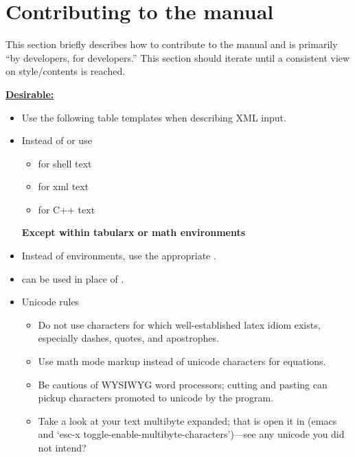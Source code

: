 
\chapter{Contributing to the manual}
\label{chap:contrib}

This section briefly describes how to contribute to the manual and is primarily ``by developers, for developers.''   This section should iterate until a consistent view on style/contents is reached.

\textbf{\underline{Desirable:}}
\begin{itemize}
\item{Use the following table templates when describing XML input.}
\item{Instead of \ilatex{\\texttt} or \ilatex{\\verb} use
    \begin{itemize}
      \item{\ilatex{\\ishell} for shell text}
      \item{\ilatex{\\ixml} for xml text}
      \item{\ilatex{\\icode} for C++ text}
      \end{itemize}
     \bf{Except} within tabularx or math environments}
    \item{Instead of  environments, use the appropriate }.
\item{ can be used in place of }.
\item{Unicode rules}
\begin{itemize}
\item Do not use characters for which well-established latex idiom exists, especially dashes, quotes, and apostrophes.
\item Use math mode markup instead of unicode characters for equations.
\item Be cautious of WYSIWYG word processors; cutting and pasting can pickup characters promoted to unicode by the program.
\item Take a look at your text multibyte expanded; that is open it in (emacs and `esc-x toggle-enable-multibyte-characters')---see any unicode you did not intend?

\end{itemize}
\end{itemize}

